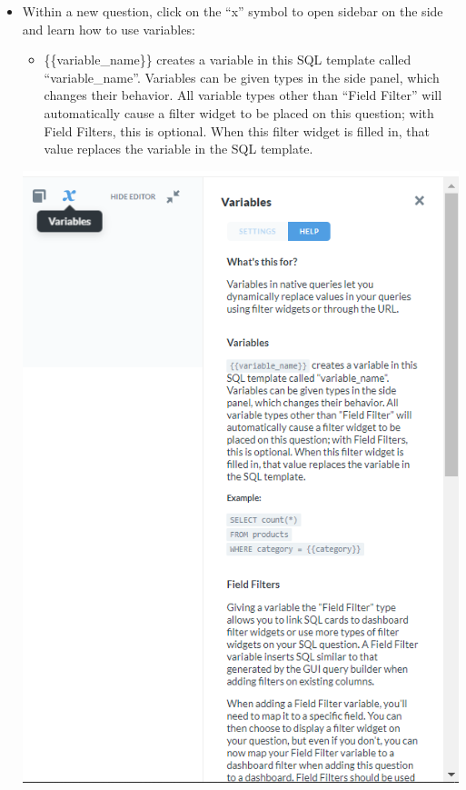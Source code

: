 \documentclass[
]{book}
\providecommand{\tightlist}{%
  \setlength{\itemsep}{0pt}\setlength{\parskip}{0pt}}
\begin{document}
\begin{itemize}
\item
  Within a new question, click on the ``x'' symbol to open sidebar on the side and learn how to use variables:

  \begin{itemize}
  \tightlist
  \item
    \{\{variable\_name\}\} creates a variable in this SQL template called ``variable\_name''. Variables can be given types in the side panel, which changes their behavior. All variable types other than ``Field Filter'' will automatically cause a filter widget to be placed on this question; with Field Filters, this is optional. When this filter widget is filled in, that value replaces the variable in the SQL template.
  \end{itemize}

  \includegraphics{images/Variables.png}
\end{itemize}
\end{document}
